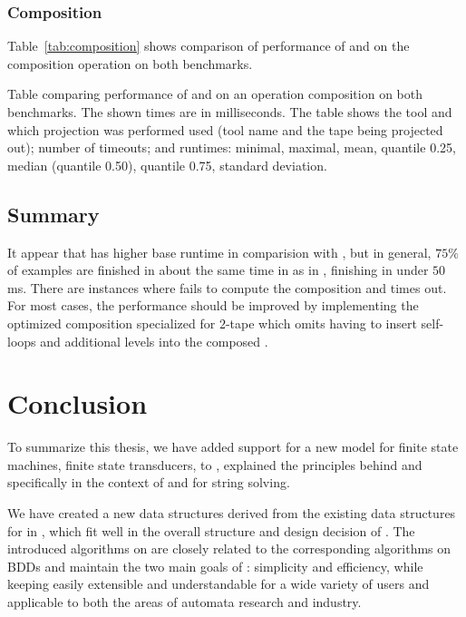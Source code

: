 \subsection{Composition}

Table~\ref{tab:composition} shows comparison of performance of \mata and \mona on the composition operation on both benchmarks.

\begin{table}[ht]
  \centering
  
  \caption{
    Table comparing performance of \mata and \mona on an operation composition on both benchmarks.
    The shown times are in milliseconds.
    The table shows the tool and which projection was performed used (tool name and the tape being projected out); number of timeouts; and runtimes: minimal, maximal, mean, quantile 0.25, median (quantile 0.50), quantile 0.75, standard deviation.
  }
  \label{tab:composition}
\end{table}


\section{Summary}

It appear that \mata has higher base runtime in comparision with \mona, but in general, $75 \%$ of examples are finished in about the same time in \mata as in \mona, finishing in under $50$ ms.
There are instances where \mata fails to compute the composition and times out.
For most cases, the performance should be improved by implementing the optimized composition specialized for $2$-tape \nfts which omits having to insert self-loops and additional levels into the composed \nfts.

\chapter{Conclusion}

To summarize this thesis, we have added support for a new model for finite state machines, finite state transducers, to \mata, explained the principles behind \nfts and specifically \nfts in the context of \mata and \noodler for string solving.

We have created a new data structures derived from the existing data structures for \nfas in \mata, which fit well in the overall structure and design decision of \mata.
The introduced algorithms on \nfts are closely related to the corresponding algorithms on BDDs and maintain the two main goals of \mata: simplicity and efficiency, while keeping \mata easily extensible and understandable for a wide variety of users and applicable to both the areas of automata research and industry.

